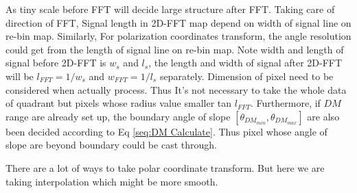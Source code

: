 \documentclass[iop]{emulateapj}
\begin{document}
As tiny scale before FFT will decide large structure after FFT. Taking care of direction of FFT, Signal length in 2D-FFT map depend on width of signal line on re-bin map. Similarly, For polarization coordinates transform, the angle resolution could get from the length of signal line on re-bin map.  Note width and length of signal before 2D-FFT is $w_s$ and $l_s$, the length and width of signal after 2D-FFT will be $l_{FFT}=1/w_s$ and $w_{FFT}=1/l_s$ separately. Dimension of pixel need to be considered when actually process.
Thus It's not necessary to take the whole data of quadrant \uppercase\expandafter{} but pixels whose radius value smaller tan $l_{FFT}$.  Furthermore, if $DM$ range are already set up, the boundary angle of slope $[\theta_{DM_{min}},\theta_{DM_{max}}]$ are also been decided according to Eq \ref{seq:DM Calculate}.  Thus pixel whose angle of slope are beyond boundary could be cast through.

There are a lot of ways to take polar coordinate transform. But here we are taking interpolation which might be more smooth. 
%
%
%  
%   
%    
%  
%  
\end{document}
